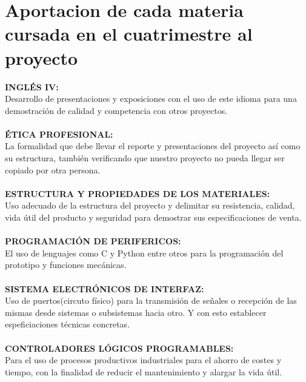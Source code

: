\documentclass[11pt,a4paper]{article}
\begin{document}
\section{Aportacion de cada materia cursada en el cuatrimestre al proyecto}
\textbf{INGLÉS IV:}\\ Desarrollo de presentaciones y exposiciones con el uso de este idioma para una demostración de calidad y competencia con otros proyectos.\\\\
\textbf{ÉTICA PROFESIONAL:}\\ La formalidad que debe llevar el reporte y presentaciones del proyecto así como su estructura, también verificando que nuestro proyecto no pueda llegar ser copiado por otra persona.\\\\
\textbf{ESTRUCTURA Y PROPIEDADES DE LOS MATERIALES:}\\ Uso adecuado de la estructura del proyecto y delimitar su resistencia, calidad, vida útil del producto y seguridad para demostrar sus especificaciones de venta.\\\\
\textbf{PROGRAMACIÓN DE PERIFERICOS:}\\ El uso de lenguajes como C y Python entre otros para la programación del prototipo y funciones mecánicas.\\\\
\textbf{SISTEMA ELECTRÓNICOS DE INTERFAZ:}\\ Uso de puertos(circuto físico) para la transmisión de señales o recepción de las mismas desde sistemas o subsistemas hacia otro. Y con esto establecer espeficiaciones técnicas concretas.\\\\
\textbf{CONTROLADORES LÓGICOS PROGRAMABLES:}\\ Para el uso de procesos productivos industriales para el ahorro de costes y tiempo, con la finalidad de reducir el mantenimiento y alargar la vida útil.
\pagebreak
\end{document}
